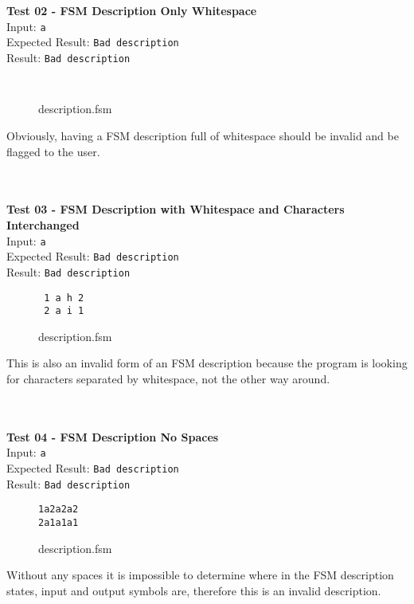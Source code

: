 \documentclass{article}
\begin{document}
\noindent \\ \\ \textbf{Test 02 - FSM Description Only Whitespace} \\
\noindent Input: \verb+a+ \\
Expected Result: \verb+Bad description+ \\
Result: \verb+Bad description+ \\
\begin{figure}[H]
\center
\begin{BVerbatim}
            
\end{BVerbatim}
\caption{description.fsm}
\end{figure}
\noindent Obviously, having a FSM description full of whitespace should be invalid and be flagged to the user.

\noindent \\ \\ \textbf{Test 03 - FSM Description with Whitespace and Characters Interchanged} \\
\noindent Input: \verb+a+ \\
Expected Result: \verb+Bad description+ \\
Result: \verb+Bad description+ \\
\begin{figure}[H]
\center
\begin{BVerbatim}
 1 a h 2
 2 a i 1
\end{BVerbatim}
\caption{description.fsm}
\end{figure}
\noindent This is also an invalid form of an FSM description because the program is looking for characters separated by whitespace, not the other way around.

\noindent \\ \\ \textbf{Test 04 - FSM Description No Spaces} \\
\noindent Input: \verb+a+ \\
Expected Result: \verb+Bad description+ \\
Result: \verb+Bad description+ \\
\begin{figure}[H]
\center
\begin{BVerbatim}
1a2a2a2
2a1a1a1
\end{BVerbatim}
\caption{description.fsm}
\end{figure}
\noindent Without any spaces it is impossible to determine where in the FSM description states, input and output symbols are, therefore this is an invalid description.
\end{document}
